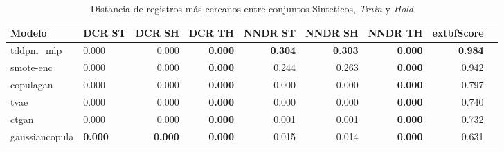 \begin{table}[H]
\centering
\caption{Distancia de registros más cercanos entre conjuntos Sinteticos, \emph{Train} y \emph{Hold}}
\label{table-dcr-economicos-b-1}
\begin{tabular}{|l|l|r|r|r|r|r|r|r|}
\hline
\rowcolor[gray]{0.8}
Modelo & DCR ST & DCR SH & DCR TH & NNDR ST & NNDR SH & NNDR TH & 	extbf{Score} \\
\hline tddpm\_mlp & 0.000 & 0.000 & \cellcolor[rgb]{0.9, 0.54, 0.52} \bfseries 0.000 & \bfseries 0.304 & \bfseries 0.303 & \cellcolor[rgb]{0.9, 0.54, 0.52} \bfseries 0.000 & \bfseries 0.984 \\
\hline smote-enc & 0.000 & 0.000 & \cellcolor[rgb]{0.9, 0.54, 0.52} \bfseries 0.000 & 0.244 & 0.263 & \cellcolor[rgb]{0.9, 0.54, 0.52} \bfseries 0.000 & 0.942 \\
\hline copulagan & \cellcolor[rgb]{0.9, 0.54, 0.52} 0.000 & \cellcolor[rgb]{0.9, 0.54, 0.52} 0.000 & \cellcolor[rgb]{0.9, 0.54, 0.52} \bfseries 0.000 & \cellcolor[rgb]{0.9, 0.54, 0.52} 0.000 & \cellcolor[rgb]{0.9, 0.54, 0.52} 0.000 & \cellcolor[rgb]{0.9, 0.54, 0.52} \bfseries 0.000 & 0.797 \\
\hline tvae & 0.000 & 0.000 & \cellcolor[rgb]{0.9, 0.54, 0.52} \bfseries 0.000 & 0.000 & 0.000 & \cellcolor[rgb]{0.9, 0.54, 0.52} \bfseries 0.000 & 0.740 \\
\hline ctgan & 0.000 & 0.000 & \cellcolor[rgb]{0.9, 0.54, 0.52} \bfseries 0.000 & 0.001 & 0.001 & \cellcolor[rgb]{0.9, 0.54, 0.52} \bfseries 0.000 & 0.732 \\
\hline gaussiancopula & \bfseries 0.000 & \bfseries 0.000 & \cellcolor[rgb]{0.9, 0.54, 0.52} \bfseries 0.000 & 0.015 & 0.014 & \cellcolor[rgb]{0.9, 0.54, 0.52} \bfseries 0.000 & 0.631 \\
\hline
\end{tabular}
\end{table}

